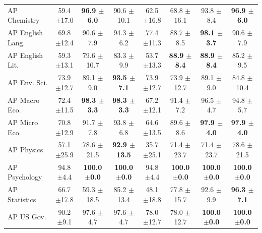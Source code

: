 \documentclass[dvipsnames]{fairmeta}
\begin{document}
\begin{table}[t]
\begin{NiceTabular}{lccccccc}
AP Chemistry & 59.4 \scriptsize{$\pm$17.0} & \textbf{96.9 \scriptsize{$\pm$6.0}} & 90.6 \scriptsize{$\pm$10.1} & 62.5 \scriptsize{$\pm$16.8} & 68.8 \scriptsize{$\pm$16.1} & 93.8 \scriptsize{$\pm$8.4} & \textbf{96.9 \scriptsize{$\pm$6.0}} \\
AP English Lang. & 69.8 \scriptsize{$\pm$12.4} & 90.6 \scriptsize{$\pm$7.9} & 94.3 \scriptsize{$\pm$6.2} & 77.4 \scriptsize{$\pm$11.3} & 88.7 \scriptsize{$\pm$8.5} & \textbf{98.1 \scriptsize{$\pm$3.7}} & 90.6 \scriptsize{$\pm$7.9} \\
AP English Lit. & 59.3 \scriptsize{$\pm$13.1} & 79.6 \scriptsize{$\pm$10.7} & 83.3 \scriptsize{$\pm$9.9} & 53.7 \scriptsize{$\pm$13.3} & \textbf{88.9 \scriptsize{$\pm$8.4}} & \textbf{88.9 \scriptsize{$\pm$8.4}} & 85.2 \scriptsize{$\pm$9.5} \\
AP Env. Sci. & 73.9 \scriptsize{$\pm$12.7} & 89.1 \scriptsize{$\pm$9.0} & \textbf{93.5 \scriptsize{$\pm$7.1}} & 73.9 \scriptsize{$\pm$12.7} & 73.9 \scriptsize{$\pm$12.7} & 89.1 \scriptsize{$\pm$9.0} & 84.8 \scriptsize{$\pm$10.4} \\
AP Macro Eco. & 72.4 \scriptsize{$\pm$11.5} & \textbf{98.3 \scriptsize{$\pm$3.3}} & \textbf{98.3 \scriptsize{$\pm$3.3}} & 67.2 \scriptsize{$\pm$12.1} & 91.4 \scriptsize{$\pm$7.2} & 96.5 \scriptsize{$\pm$4.7} & 94.8 \scriptsize{$\pm$5.7} \\
AP Micro Eco. & 70.8 \scriptsize{$\pm$12.9} & 91.7 \scriptsize{$\pm$7.8} & 93.8 \scriptsize{$\pm$6.8} & 64.6 \scriptsize{$\pm$13.5} & 89.6 \scriptsize{$\pm$8.6} & \textbf{97.9 \scriptsize{$\pm$4.0}} & \textbf{97.9 \scriptsize{$\pm$4.0}} \\
AP Physics & 57.1 \scriptsize{$\pm$25.9} & 78.6 \scriptsize{$\pm$21.5} & \textbf{92.9 \scriptsize{$\pm$13.5}} & 35.7 \scriptsize{$\pm$25.1} & 71.4 \scriptsize{$\pm$23.7} & 71.4 \scriptsize{$\pm$23.7} & 78.6 \scriptsize{$\pm$21.5} \\
AP Psychology & 94.8 \scriptsize{$\pm$4.4} & \textbf{100.0 \scriptsize{$\pm$0.0}} & \textbf{100.0 \scriptsize{$\pm$0.0}} & 94.8 \scriptsize{$\pm$4.4} & \textbf{100.0 \scriptsize{$\pm$0.0}} & \textbf{100.0 \scriptsize{$\pm$0.0}} & \textbf{100.0 \scriptsize{$\pm$0.0}} \\
AP Statistics & 66.7 \scriptsize{$\pm$17.8} & 59.3 \scriptsize{$\pm$18.5} & 85.2 \scriptsize{$\pm$13.4} & 48.1 \scriptsize{$\pm$18.8} & 77.8 \scriptsize{$\pm$15.7} & 92.6 \scriptsize{$\pm$9.9} & \textbf{96.3 \scriptsize{$\pm$7.1}} \\
AP US Gov. & 90.2 \scriptsize{$\pm$9.1} & 97.6 \scriptsize{$\pm$4.7} & 97.6 \scriptsize{$\pm$4.7} & 78.0 \scriptsize{$\pm$12.7} & 78.0 \scriptsize{$\pm$12.7} & \textbf{100.0 \scriptsize{$\pm$0.0}} & \textbf{100.0 \scriptsize{$\pm$0.0}} \\

\end{NiceTabular}
\end{table}
\end{document}
